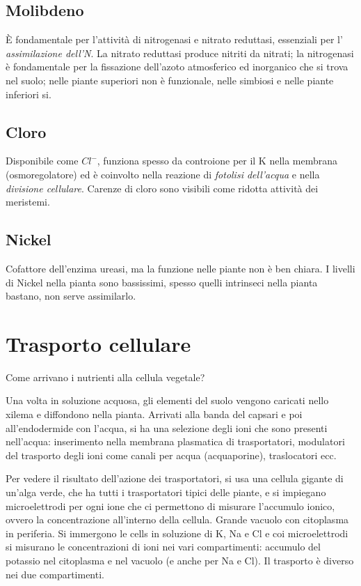 \documentclass[a4paper,12pt]{book}
\begin{document}
\subsection{Molibdeno}
È fondamentale per l'attività di nitrogenasi e nitrato reduttasi, essenziali per l' \emph{assimilazione dell'N}. La nitrato reduttasi produce nitriti da nitrati; la nitrogenasi è fondamentale per la fissazione dell'azoto atmosferico ed inorganico che si trova nel suolo; nelle piante superiori non è funzionale, nelle simbiosi e nelle piante inferiori si.

\subsection{Cloro}
Disponibile come $Cl^{-}$, funziona spesso da controione per il K nella membrana (osmoregolatore) ed è coinvolto nella reazione di \emph{fotolisi dell'acqua} e nella \emph{divisione cellulare}. Carenze di cloro sono visibili come ridotta attività dei meristemi.

\subsection{Nickel}
Cofattore dell'enzima ureasi,  ma la funzione nelle piante non è ben chiara. I livelli di Nickel nella pianta sono bassissimi, spesso quelli intrinseci nella pianta bastano, non serve assimilarlo.

\section{Trasporto cellulare}
Come arrivano i nutrienti alla cellula vegetale?

Una volta in soluzione acquosa, gli elementi del suolo vengono caricati nello xilema e diffondono nella pianta. Arrivati alla banda del capsari e poi all'endodermide con l'acqua, si ha una selezione degli ioni che sono presenti nell'acqua: inserimento nella membrana plasmatica di trasportatori, modulatori del trasporto degli ioni come canali per acqua (acquaporine), traslocatori ecc.

Per vedere il risultato dell'azione dei trasportatori, si usa una cellula gigante di un'alga verde, che ha tutti i trasportatori tipici delle piante, e si impiegano microelettrodi per ogni ione che ci permettono di misurare l'accumulo ionico, ovvero la concentrazione all'interno della cellula. Grande vacuolo con citoplasma in periferia. Si immergono le cells in soluzione di K, Na e Cl e coi microelettrodi si misurano le concentrazioni di ioni nei vari compartimenti: accumulo del potassio nel citoplasma e nel vacuolo (e anche per Na e Cl). Il trasporto è diverso nei due compartimenti.
\end{document}
